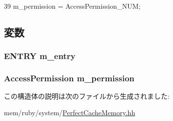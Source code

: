 \begin{DoxyCode}
39 { m_permission = AccessPermission_NUM; }
\end{DoxyCode}


\subsection{変数}
\hypertarget{structPerfectCacheLineState_ad2483e6aea81d69f15dbc409d0eed122}{
\subsubsection[{m\_\-entry}]{\setlength{\rightskip}{0pt plus 5cm}ENTRY {\bf m\_\-entry}}}
\label{structPerfectCacheLineState_ad2483e6aea81d69f15dbc409d0eed122}
\hypertarget{structPerfectCacheLineState_a747d7ae3c3f18b09e5e8cd6414b1b9d4}{
\subsubsection[{m\_\-permission}]{\setlength{\rightskip}{0pt plus 5cm}AccessPermission {\bf m\_\-permission}}}
\label{structPerfectCacheLineState_a747d7ae3c3f18b09e5e8cd6414b1b9d4}


この構造体の説明は次のファイルから生成されました:\begin{DoxyCompactItemize}
\item 
mem/ruby/system/\hyperlink{PerfectCacheMemory_8hh}{PerfectCacheMemory.hh}\end{DoxyCompactItemize}
